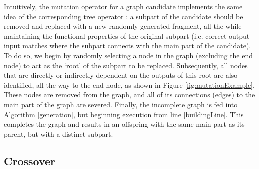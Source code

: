 \documentclass{article}
\begin{document}
Intuitively, the mutation operator for a graph candidate implements the same idea of the corresponding tree
operator \cite{aversano2006genetic}: a subpart of the candidate should be removed and replaced with a new randomly generated fragment, all
the while maintaining the functional properties of the original subpart (i.e. correct output-input matches where
the subpart connects with the main part of the candidate). To do so, we begin by randomly selecting a node in the
graph (excluding the end node) to act as the `root' of the subpart to be replaced. Subsequently, all nodes that
are directly or indirectly dependent on the outputs of this root are also identified, all the way to the end node,
as shown in Figure \ref{fig:mutationExample}. These nodes are removed from the graph, and all of its connections (edges) to the main
part of the graph are severed. Finally, the incomplete graph is fed into Algorithm \ref{generation}, but beginning
execution from line \ref{buildingLine}. This completes the graph and results in an offspring with the same main
part as its parent, but with a distinct subpart.

\subsection{Crossover}
\end{document}
